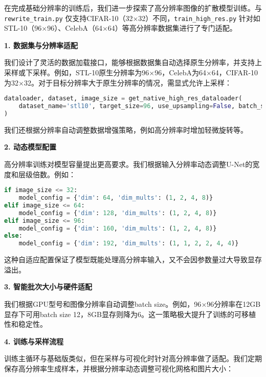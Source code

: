 \documentclass{ctexart}
\begin{document}
在完成基础分辨率的训练后，我们进一步探索了高分辨率图像的扩散模型训练。与 \texttt{rewrite\_train.py} 仅支持CIFAR-10（32$\times$32）不同，\texttt{train\_high\_res.py} 针对如STL-10（96$\times$96）、CelebA（64$\times$64）等高分辨率数据集进行了专门适配。

\vspace{0.5em}
\noindent
\textbf{1. 数据集与分辨率适配}

我们设计了灵活的数据加载接口，能够根据数据集自动选择原生分辨率，并支持上采样或下采样。例如，STL-10原生分辨率为96$\times$96，CelebA为64$\times$64，CIFAR-10为32$\times$32。对于目标分辨率大于原生分辨率的情况，需显式允许上采样：

\begin{lstlisting}[language=python]
dataloader, dataset, image_size = get_native_high_res_dataloader(
    dataset_name='stl10', target_size=96, use_upsampling=False, batch_size=16
)
\end{lstlisting}

我们还根据分辨率自动调整数据增强策略，例如高分辨率时增加轻微旋转等。

\vspace{0.5em}
\noindent
\textbf{2. 动态模型配置}

高分辨率训练对模型容量提出更高要求。我们根据输入分辨率动态调整U-Net的宽度和层级倍数。例如：

\begin{lstlisting}[language=python]
if image_size <= 32:
    model_config = {'dim': 64, 'dim_mults': (1, 2, 4, 8)}
elif image_size <= 64:
    model_config = {'dim': 128, 'dim_mults': (1, 2, 4, 8)}
elif image_size <= 96:
    model_config = {'dim': 160, 'dim_mults': (1, 2, 4, 8)}
else:
    model_config = {'dim': 192, 'dim_mults': (1, 1, 2, 2, 4, 4)}
\end{lstlisting}

这种自适应配置保证了模型既能处理高分辨率输入，又不会因参数量过大导致显存溢出。

\vspace{0.5em}
\noindent
\textbf{3. 智能批次大小与硬件适配}

我们根据GPU型号和图像分辨率自动调整batch size。例如，96$\times$96分辨率在12GB显存下可用batch size 12，8GB显存则降为6。这一策略极大提升了训练的可移植性和稳定性。

\vspace{0.5em}
\noindent
\textbf{4. 训练与采样流程}

训练主循环与基础版类似，但在采样与可视化时针对高分辨率做了适配。我们定期保存高分辨率生成样本，并根据分辨率动态调整可视化网格和图片大小：
\end{document}
